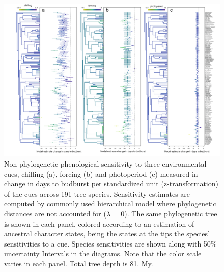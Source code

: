 \documentclass[11pt]{article}
\begin{document}
\begin{figure}
  \begin{center}
  \includegraphics[width=16cm]{../../analyses/phylogeny/figures/FigSXX_ phylo_muplots191_lamb0.pdf}
  \caption{Non-phylogenetic phenological sensitivity to three environmental cues, chilling (a), forcing (b) and photoperiod (c) measured in change in days to budburst per standardized unit (z-transformation) of the cues across 191 tree species. Sensitivity estimates are computed by commonly used hierarchical model where phylogenetic distances are not accounted for ($\lambda$ = 0). The same phylogenetic tree is shown in each panel, colored according to an estimation of ancestral character states, being the states at the tips the species' sensitivities to a cue. Species sensitivities are shown along with 50\% uncertainty Intervals in the diagrams. Note that the color scale varies in each panel. Total tree depth is 81. My.}
  \label{fig:suppmuplot_all} 
  \end{center}
\end{figure}
\end{document}
